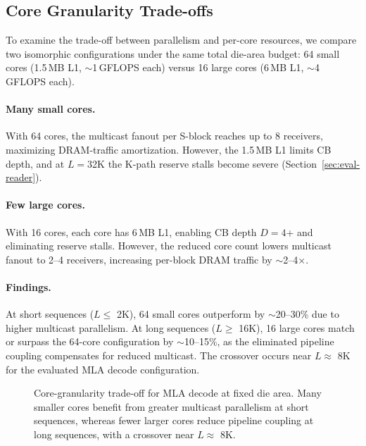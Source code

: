 \documentclass[sigconf, review, anonymous]{acmart}
\newcommand{\SblockName}{S-block}
\begin{document}

\subsection{Core Granularity Trade-offs}\label{sec:arch-granularity}


To examine the trade-off between parallelism and per-core resources, we
compare two isomorphic configurations under the same total die-area
budget: 64 small cores (1.5\,MB L1, $\sim$1\,GFLOPS each) versus
16 large cores (6\,MB L1, $\sim$4\,GFLOPS each).

\paragraph{Many small cores.}
With 64 cores, the multicast fanout per \SblockName{} reaches up to 8
receivers, maximizing DRAM-traffic amortization.  However, the
1.5\,MB L1 limits CB depth, and at $L{=}$32K the K-path reserve
stalls become severe (Section~\ref{sec:eval-reader}).

\paragraph{Few large cores.}
With 16 cores, each core has 6\,MB L1, enabling CB depth $D{=}4$+
and eliminating reserve stalls.  However, the reduced core count
lowers multicast fanout to 2--4 receivers, increasing per-block
DRAM traffic by $\sim$2--4$\times$.

\paragraph{Findings.}
At short sequences ($L \leq$ 2K), 64 small cores outperform by
$\sim$20--30\% due to higher multicast parallelism.  At long
sequences ($L \geq$ 16K), 16 large cores match or surpass the
64-core configuration by $\sim$10--15\%, as the eliminated pipeline
coupling compensates for reduced multicast.  The crossover occurs
near $L \approx$ 8K for the evaluated MLA decode configuration.

\begin{figure}[t]
  \centering
  \caption{Core-granularity trade-off for MLA decode at fixed die area.
    Many smaller cores benefit from greater multicast parallelism at
    short sequences, whereas fewer larger cores reduce pipeline
    coupling at long sequences, with a crossover near
    $L \approx$ 8K.}
  \label{fig:core-granularity}
\end{figure}
\end{document}

